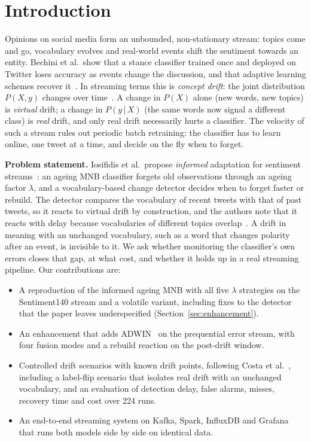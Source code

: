 \documentclass[conference]{IEEEtran}
\begin{document}
\section{Introduction}
Opinions on social media form an unbounded, non-stationary stream: topics come and go,
vocabulary evolves and real-world events shift the sentiment towards an entity. Bechini et
al.\ show that a stance classifier trained once and deployed on Twitter loses accuracy as
events change the discussion, and that adaptive learning schemes recover it~\cite{bechini2021}.
In streaming terms this is \emph{concept drift}: the joint distribution $P(X, y)$ changes
over time~\cite{gama2014}. A change in $P(X)$ alone (new words, new topics) is \emph{virtual}
drift; a change in $P(y\,|\,X)$ (the same words now signal a different class) is \emph{real}
drift, and only real drift necessarily hurts a classifier. The velocity of such a stream rules
out periodic batch retraining: the classifier has to learn online, one tweet at a time, and
decide on the fly when to forget.

\textbf{Problem statement.} Iosifidis et al.\ propose \emph{informed} adaptation for sentiment
streams~\cite{iosifidis2017}: an ageing MNB classifier forgets old observations through an
ageing factor $\lambda$, and a vocabulary-based change detector decides when to forget faster
or rebuild. The detector compares the vocabulary of recent tweets with that of past tweets, so
it reacts to virtual drift by construction, and the authors note that it reacts with delay
because vocabularies of different topics overlap~\cite{iosifidis2017}. A drift in meaning with
an unchanged vocabulary, such as a word that changes polarity after an event, is invisible to
it. We ask whether monitoring the classifier's own errors closes that gap, at what cost, and
whether it holds up in a real streaming pipeline. Our contributions are:
\begin{itemize}
\item A reproduction of the informed ageing MNB with all five $\lambda$ strategies on the
  Sentiment140 stream and a volatile variant, including fixes to the detector that the paper
  leaves underspecified (Section~\ref{sec:enhancement}).
\item An enhancement that adds ADWIN~\cite{bifet2007} on the prequential error stream, with four
  fusion modes and a rebuild reaction on the post-drift window.
\item Controlled drift scenarios with known drift points, following Costa et
  al.~\cite{costa2014}, including a label-flip scenario that isolates real drift with an
  unchanged vocabulary, and an evaluation of detection delay, false alarms, misses, recovery
  time and cost over 224 runs.
\item An end-to-end streaming system on Kafka, Spark, InfluxDB and Grafana that runs both models
  side by side on identical data.
\end{itemize}
\end{document}
